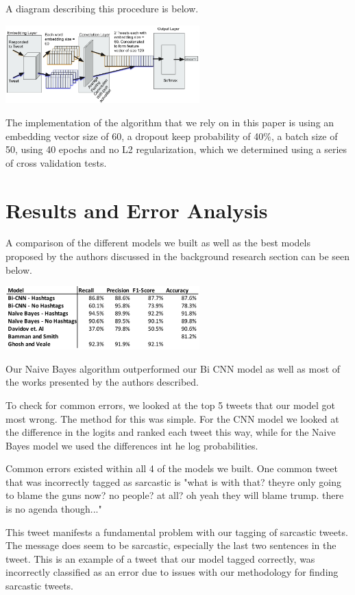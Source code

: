 \documentclass[11pt,a4paper]{article}
\begin{document}
A diagram describing this procedure is below.

\includegraphics[width=75mm,scale=0.5]{bcnn.png}


The implementation of the algorithm that we rely on in this paper is using an embedding vector size of 60, a dropout keep probability of 40\%, a batch size of 50, using 40 epochs and no L2 regularization, which we determined using a series of cross validation tests.

\section{Results and Error Analysis}

A comparison of the different models we built as well as the best models proposed by the authors discussed in the background research section can be seen below.

\includegraphics[width=75mm,scale=0.5]{results.png}

Our Naive Bayes algorithm outperformed our Bi CNN model as well as most of the works presented by the authors described.

To check for common errors, we looked at the top 5 tweets that our model got most wrong. The method for this was simple. For the CNN model we looked at the difference in the logits and ranked each tweet this way, while for the Naive Bayes model we used the differences int he log probabilities. 

Common errors existed within all 4 of the models we built. One common tweet that was incorrectly tagged as sarcastic is "what is with that? theyre only going to blame the guns now? no people? at all? oh yeah they will blame trump. there is no agenda though..."

This tweet manifests a fundamental problem with our tagging of sarcastic tweets. The message does seem to be sarcastic, especially the last two sentences in the tweet. This is an example of a tweet that our model tagged correctly, was incorrectly classified as an error due to issues with our methodology for finding sarcastic tweets. 
\end{document}
